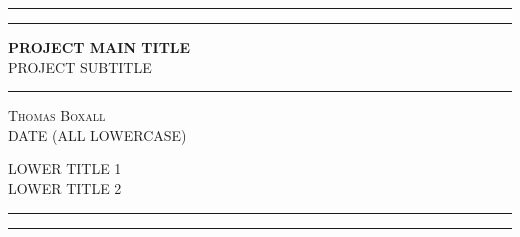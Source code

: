
\begin{titlepage} %
	
	\centering %
	
	
	\rule{\textwidth}{1pt} %
	
	\vspace{2pt}\vspace{-\baselineskip} %
	
	\rule{\textwidth}{0.4pt} %
	
	\vspace{0.1\textheight} %
	

	{\Huge \textbf{PROJECT MAIN TITLE}}\\[0.5\baselineskip] %
	{\Huge PROJECT SUBTITLE} %

	
	\vspace{0.025\textheight} %
	
	\rule{0.3\textwidth}{0.4pt} %

	\vspace{0.1\textheight} %
	
	
	{\Large \textsc{Thomas Boxall}} \\%
	{\large\textsc{DATE (ALL LOWERCASE)}} %
	
	\vfill %
	
	
	{\large\textsc{LOWER TITLE 1}} \\
	{\large\textsc{LOWER TITLE 2}}
	
	\vspace{0.1\textheight} %
	
	
	\rule{\textwidth}{0.4pt} %
	
	\vspace{2pt}\vspace{-\baselineskip} %
	
	\rule{\textwidth}{1pt} %
	
\end{titlepage}
